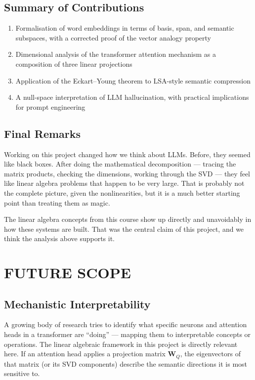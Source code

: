 \documentclass[12pt,a4paper]{article}
\begin{document}
\subsection{Summary of Contributions}

\begin{enumerate}[label=\arabic*., itemsep=6pt]
    \item Formalisation of word embeddings in terms of basis, span, and semantic subspaces,
          with a corrected proof of the vector analogy property
    \item Dimensional analysis of the transformer attention mechanism as a composition of
          three linear projections
    \item Application of the Eckart--Young theorem to LSA-style semantic compression
    \item A null-space interpretation of LLM hallucination, with practical implications
          for prompt engineering
\end{enumerate}

\subsection{Final Remarks}

Working on this project changed how we think about LLMs. Before, they seemed like black
boxes. After doing the mathematical decomposition --- tracing the matrix products, checking
the dimensions, working through the SVD --- they feel like linear algebra problems that
happen to be very large. That is probably not the complete picture, given the
nonlinearities, but it is a much better starting point than treating them as magic.

The linear algebra concepts from this course show up directly and unavoidably in how these
systems are built. That was the central claim of this project, and we think the analysis
above supports it.

\section{FUTURE SCOPE}

\subsection{Mechanistic Interpretability}

A growing body of research tries to identify what specific neurons and attention heads in
a transformer are ``doing'' --- mapping them to interpretable concepts or operations. The
linear algebraic framework in this project is directly relevant here. If an attention head
applies a projection matrix $\mathbf{W}_Q$, the eigenvectors of that matrix (or its SVD
components) describe the semantic directions it is most sensitive to.
\end{document}
